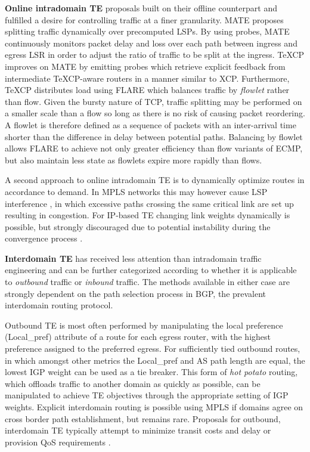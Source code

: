 \textbf{Online intradomain \ac{TE}} proposals built on their offline counterpart and fulfilled a desire for controlling traffic at a finer granularity. 
MATE \cite{Elwalid:2002p153} proposes splitting traffic dynamically over precomputed \acp{LSP}. 
By using probes, MATE continuously monitors packet delay and loss over each path between ingress and egress \ac{LSR} in order to adjust the ratio of traffic to be split at the ingress.
TeXCP \cite{Kandula:2005p90} improves on MATE by emitting probes which retrieve explicit feedback from intermediate TeXCP-aware routers in a manner similar to \ac{XCP}.
Furthermore, TeXCP distributes load using FLARE \cite{Sinha:2004p124} which balances traffic by \emph{flowlet} rather than flow.
Given the bursty nature of \ac{TCP}, traffic splitting may be performed on a smaller scale than a flow so long as there is no risk of causing packet reordering.
A flowlet is therefore defined as a sequence of packets with an inter-arrival time shorter than the difference in delay between potential paths.
Balancing by flowlet allows FLARE to achieve not only greater efficiency than flow variants of \ac{ECMP}, but also maintain less state as flowlets expire more rapidly than flows.

A second approach to online intradomain \ac{TE} is to dynamically optimize routes in accordance to demand.
In \ac{MPLS} networks this may however cause \ac{LSP} interference \cite{Kodialam:2000p508}, in which excessive paths crossing the same critical link are set up resulting in congestion.
For IP-based \ac{TE} changing link weights dynamically is possible, but strongly discouraged due to potential instability during the convergence process \cite{Labovitz:1998p505}.


\textbf{Interdomain \ac{TE}} has received less attention than intradomain traffic engineering and can be further categorized according to whether it is applicable to \emph{outbound} traffic or \emph{inbound} traffic. The methods available in either case are strongly dependent on the path selection process \cite{Quoitin:2003p218} in \ac{BGP}, the prevalent interdomain routing protocol.

Outbound \ac{TE} is most often performed by manipulating the local preference (Local\_pref) attribute of a route for each egress router, with the highest preference assigned to the preferred egress.
For sufficiently tied outbound routes, in which amongst other metrics the Local\_pref and \ac{AS} path length are equal, the lowest \ac{IGP} weight can be used as a tie breaker. This form of \emph{hot potato} routing, which offloads traffic to another domain as quickly as possible, can be manipulated to achieve \ac{TE} objectives through the appropriate setting of \ac{IGP} weights.
Explicit interdomain routing is possible using \ac{MPLS} if domains agree on cross border path establishment, but remains rare.
Proposals for outbound, interdomain \ac{TE} typically attempt to minimize transit costs and delay \cite{Uhlig:2004p144,Goldenberg:2004p93} or provision \ac{QoS} requirements \cite{Howarth:2005p511}.

